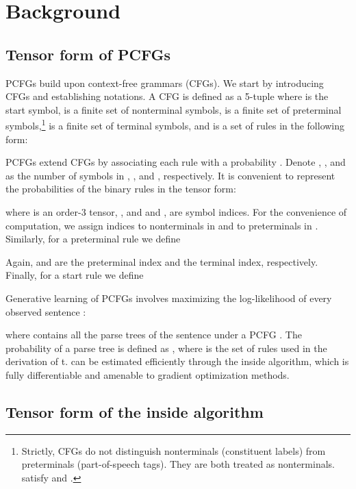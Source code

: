\documentclass[11pt]{article}
\begin{document}
\section{Background}

\subsection{Tensor form of PCFGs}\label{sec:t-pcfg}
PCFGs build upon context-free grammars (CFGs). 
We start by introducing CFGs and establishing notations.
A CFG is defined as a 5-tuple  where  is the start symbol,  is a finite set of nonterminal symbols,  is a finite set of preterminal symbols,\footnote{Strictly, CFGs do not distinguish nonterminals  (constituent labels) from preterminals  (part-of-speech tags). 
	They are both treated as nonterminals. 
	 satisfy  and .} 
 is a finite set of terminal symbols, and  is a set of rules in the following form:

PCFGs extend CFGs by associating each rule  with a probability .
Denote , , and  
as the number of symbols in , , and , respectively. 
It is convenient to represent the probabilities of the binary rules in the tensor form:

where  is an order-3 tensor, , and
 and ,  are symbol indices.
For the convenience of computation, 
we assign indices  to nonterminals in  and  to preterminals in .
Similarly, for a preterminal rule we define

Again,  and  are the preterminal index and the terminal index, respectively. Finally, for a start rule we define


Generative learning of PCFGs involves maximizing the log-likelihood of every observed sentence :

where  contains all the parse trees of the sentence  under a PCFG . The probability of a parse tree  is defined as , where  is the set of rules used in the derivation of t.  can be estimated efficiently through the inside algorithm, which is fully differentiable and amenable to gradient optimization methods. 

















\subsection{Tensor form of the inside algorithm}\label{sec:t-inside}
\end{document}
